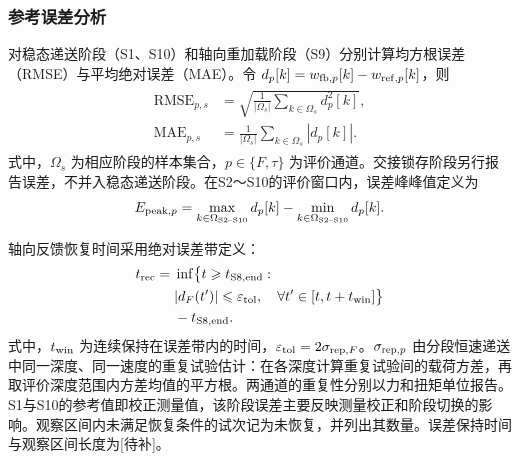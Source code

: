 \documentclass{JQRnew}
\providecommand{\RevisionColor}{\color{black}}
\newcommand{\revbegin}{\begingroup\RevisionColor}
\newcommand{\revend}{\par\endgroup}
\begin{document}
\subsubsection{参考误差分析}

\revbegin
对稳态递送阶段（S1、S10）和轴向重加载阶段（S9）分别计算均方根误差（RMSE）与平均绝对误差（MAE）。令 $d_p[k]=w_{{\rm fb},p}[k]-w_{{\rm ref},p}[k]$，则
\begin{align}
\label{eq:rmse-mae}
\begin{aligned}
\mathrm{RMSE}_{p,s}&=\sqrt{\frac{1}{|\Omega_s|}\sum_{k\in\Omega_s}d_p^2[k]},\\
\mathrm{MAE}_{p,s}&=\frac{1}{|\Omega_s|}\sum_{k\in\Omega_s}|d_p[k]|.
\end{aligned}
\end{align}
式中，$\Omega_s$ 为相应阶段的样本集合，$p\in\{F,\tau\}$ 为评价通道。交接锁存阶段另行报告误差，不并入稳态递送阶段。在S2～S10的评价窗口内，误差峰峰值定义为
\begin{align}
\label{eq:peak-error}
E_{{\rm peak},p}=
\max_{k\in\Omega_{\rm S2\text{--}S10}}d_p[k]
-\min_{k\in\Omega_{\rm S2\text{--}S10}}d_p[k].
\end{align}
\revend

轴向反馈恢复时间采用绝对误差带定义：
\begin{align}
\label{eq:recovery-time}
\begin{aligned}
t_{\rm rec}={}&\inf\bigl\{t\ge t_{\rm S8,end}:\\
&|d_F(t')|\le\varepsilon_{\rm tol},\quad
\forall t'\in[t,t+t_{\rm win}]\bigr\}\\
&-t_{\rm S8,end}.
\end{aligned}
\end{align}
式中，$t_{\rm win}$ 为连续保持在误差带内的时间，$\varepsilon_{\rm tol}=2\sigma_{{\rm rep},F}$。$\sigma_{{\rm rep},p}$ 由分段恒速递送中同一深度、同一速度的重复试验估计：在各深度计算重复试验间的载荷方差，再取评价深度范围内方差均值的平方根。两通道的重复性分别以力和扭矩单位报告。S1与S10的参考值即校正测量值，该阶段误差主要反映测量校正和阶段切换的影响。观察区间内未满足恢复条件的试次记为未恢复，并列出其数量。误差保持时间与观察区间长度为[待补]。
\end{document}
